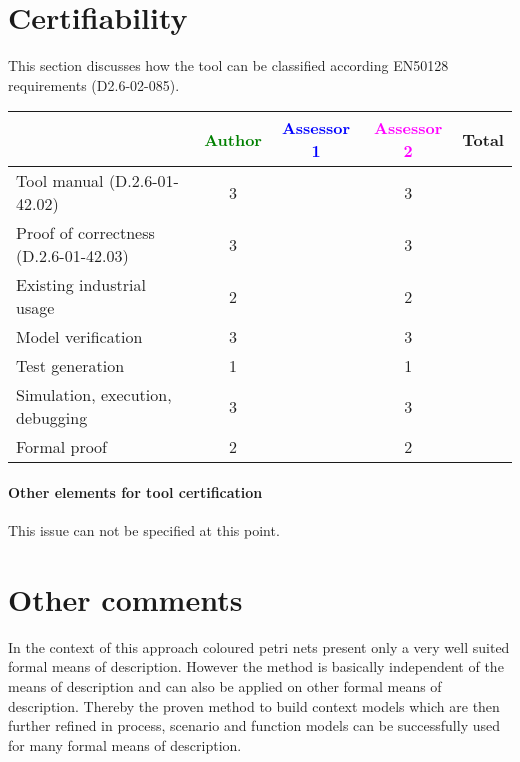 \section{Certifiability}

This section discusses how the tool can be classified according EN50128 requirements (D2.6-02-085).


\begin{tabular}{|l | c | c | c | c|}
\hline
& \textcolor{green}{Author} & \textcolor{blue}{Assessor 1} & \textcolor{magenta}{Assessor 2} & Total \\
\hline 
Tool manual (D.2.6-01-42.02) & 3    & & 3    &  \\
\hline
Proof of correctness (D.2.6-01-42.03)   & 3     & & 3    & \\
\hline
Existing industrial  usage  & 2    & & 2    & \\
\hline
Model verification & 3    & & 3    & \\
\hline
Test generation & 1    & & 1    & \\
\hline
Simulation, execution, debugging & 3    & & 3    & \\
\hline
Formal proof & 2    & & 2    & \\
\hline
\end{tabular}


\paragraph{Other elements for tool certification}
This issue can not be specified at this point.


\section{Other comments}
In the context of this approach coloured petri nets present only a very well suited formal means of description. However the method is basically independent of the means of description and can also be applied on other formal means of description. Thereby the proven method to build context models which are then further refined in process, scenario and function models can be successfully used for many formal means of description. 



